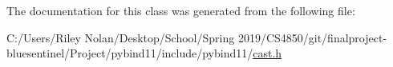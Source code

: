 The documentation for this class was generated from the following file\+:\begin{DoxyCompactItemize}
\item 
C\+:/\+Users/\+Riley Nolan/\+Desktop/\+School/\+Spring 2019/\+C\+S4850/git/finalproject-\/bluesentinel/\+Project/pybind11/include/pybind11/\mbox{\hyperlink{cast_8h}{cast.\+h}}\end{DoxyCompactItemize}

